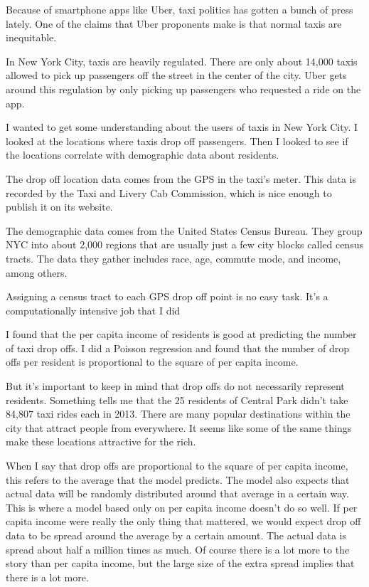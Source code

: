 Because of smartphone apps like Uber, taxi politics has gotten a bunch of press lately. One of the claims that Uber proponents make is that normal taxis are inequitable. 

In New York City, taxis are heavily regulated. There are only about 14,000 taxis allowed to pick up passengers off the street in the center of the city. Uber gets around this regulation by only picking up passengers who requested a ride on the app.

I wanted to get some understanding about the users of taxis in New York City.  I looked at the locations where taxis drop off passengers. Then I looked to see if the locations correlate with demographic data about residents.

The drop off location data comes from the GPS in the taxi's meter. This data is recorded by the Taxi and Livery Cab Commission, which is nice enough to publish it on its website.

The demographic data comes from the United States Census Bureau.  They group NYC into about 2,000 regions that are usually just a few city blocks called census tracts. The data they gather includes race, age, commute mode, and income, among others.

Assigning a census tract to each GPS drop off point is no easy task. It's a computationally intensive job that I did

I found that the per capita income of residents is good at predicting the number of taxi drop offs. I did a Poisson regression and found that the number of drop offs per resident is proportional to the square of per capita income.

But it's important to keep in mind that drop offs do not necessarily represent residents. Something tells me that the 25 residents of Central Park didn't take 84,807 taxi rides each in 2013. There are many popular destinations within the city that attract people from everywhere. It seems like some of the same things make these locations attractive for the rich.

When I say that drop offs are proportional to the square of per capita income, this refers to the average that the model predicts. The model also expects that actual data will be randomly distributed around that average in a certain way. This is where a model based only on per capita income doesn't do so well. If per capita income were really the only thing that mattered, we would expect drop off data to be spread around the average by a certain amount. The actual data is spread about half a million times as much. Of course there is a lot more to the story than per capita income, but the large size of the extra spread implies that there is a lot more.










